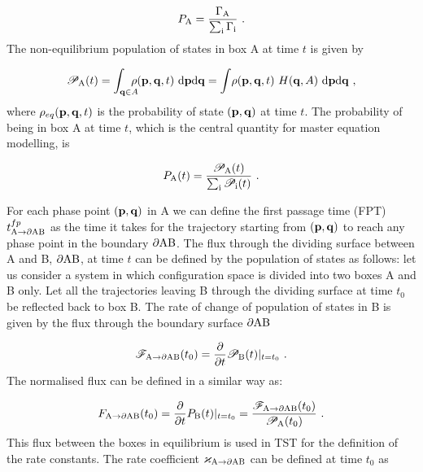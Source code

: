\begin{equation}
\label{eq:prob}
P_{\rm A }
= \frac{\Gamma_{\rm A }}{\sum_{\rm i} \Gamma_{\rm i}} ~.
\end{equation}
The non-equilibrium population of states in box A at time $t$ is given by

\begin{equation}
\mathscr{P}_{\rm A}(t) = \int_{{\bf q} \in A} \!\!\!\!\! \rho ({\bf p},{\bf q}, t ) ~ {\rm d}{\bf p} {\rm d}{\bf q} 
= \int \! \rho ({\bf p},{\bf q}, t ) ~ H({\bf q} , A) ~ {\rm d}{\bf p} {\rm d}{\bf q} ~ ,
\end{equation}
where $\rho_{eq}({\bf p},{\bf q},t)$ is the probability of state $({\bf p},{\bf q})$ at time $t$.
The probability of being in box A at time $t$, which is the central quantity for master equation modelling, is 

\begin{equation}
\label{eq:probt}
P_{\rm A } (t)
= \frac{\mathscr{P}_{\rm A }(t)}{\sum_{\rm i} \mathscr{P}_{\rm i} (t)} ~.
\end{equation}

For each phase point $({\bf p},{\bf q} )$ in A we can define the first passage time (FPT) $t^{fp}_{\rm A \rightarrow \partial AB}$ as the time it takes for the trajectory starting from $({\bf p},{\bf q} )$ to reach any phase point in the boundary $\rm \partial AB$.
The flux through the dividing surface between A and B, $\partial \rm AB$, at time $t$ can be defined by the population of states as follows:
let us consider a system in which configuration space is divided into two boxes A and B only.
Let all the trajectories leaving B through the dividing surface at time $t_0$ be reflected back to box B.
The rate of change of population of states in B is given by the flux through the boundary surface $\rm \partial AB$

\begin{equation}
\label{eq:def-flux}
\mathscr{F}_{\rm A \rightarrow \partial AB } (t_0)
= \frac{\partial}{\partial t} \mathscr{P}_{\rm B } (t) |_{t=t_0} ~.
\end{equation}
The normalised flux can be defined in a similar way as:

\begin{equation}
\label{eq:def-flux-norm}
F_{\rm A \rightarrow \partial AB } (t_0)
= \frac{\partial}{\partial t} P_{\rm B } (t) |_{t=t_0} 
= \frac{\mathscr{F}_{\rm A \rightarrow \partial AB } (t_0)}{\mathscr{P}_{\rm A} (t_0)} ~.
\end{equation}
This flux between the boxes in equilibrium is used in TST for the definition of the rate constants.
The rate coefficient $\varkappa_{\rm A \rightarrow \partial AB}$ can be defined at time $t_0$ as 

